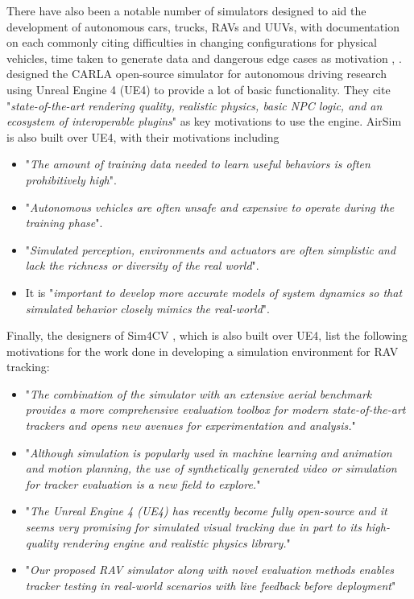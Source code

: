 There have also been a notable number of simulators designed to aid the development of autonomous cars, trucks, RAVs and UUVs, with documentation on each commonly citing difficulties in changing configurations for physical vehicles, time taken to generate data and dangerous edge cases as motivation \cite{Dosovitskiy2017CARLA:Simulator} \cite{Wymann2015TORCS:Simulator}, \cite{Shah2017AirSim:Vehicles} \cite{Bojarski2016EndCars}. \citeauthor{Dosovitskiy2017CARLA:Simulator} designed the CARLA open-source simulator \cite{Dosovitskiy2017CARLA:Simulator} for autonomous driving research using Unreal Engine 4 (UE4) to provide a lot of basic functionality. They cite "\textit{state-of-the-art rendering quality, realistic physics, basic NPC logic, and an ecosystem of interoperable plugins}" as key motivations to use the engine. AirSim \cite{Shah2017AirSim:Vehicles} is also built over UE4, with their motivations including
\begin{itemize}
    \item "\textit{The amount of training data needed to learn useful behaviors is often prohibitively high}".
    \item "\textit{Autonomous vehicles are often unsafe and expensive to operate during the training phase}".
    \item "\textit{Simulated perception, environments and actuators are often simplistic and lack the richness or diversity of the real world}".
    \item It is "\textit{important to develop more accurate models of system dynamics so that simulated behavior closely mimics the real-world}".
\end{itemize}

Finally, the designers of Sim4CV \cite{Mueller2016ATracking}, which is also built over UE4, list the following motivations for the work done in developing a simulation environment for RAV tracking:
\begin{itemize}
    \item "\textit{The combination of the simulator with an extensive aerial benchmark provides a more comprehensive evaluation toolbox for modern state-of-the-art trackers and opens new avenues for experimentation and analysis.}"
    \item {} "\textit{Although simulation is popularly used in machine learning and animation and motion planning, the use of synthetically generated video or simulation for tracker evaluation is a new field to explore.}"
    \item "\textit{The Unreal Engine 4 (UE4) has recently become fully open-source and it seems very promising for simulated visual tracking due in part to its high-quality rendering engine and realistic physics library.}"
    \item "\textit{Our proposed RAV simulator along with novel evaluation methods enables tracker testing in real-world scenarios with live feedback before deployment}"
\end{itemize}

